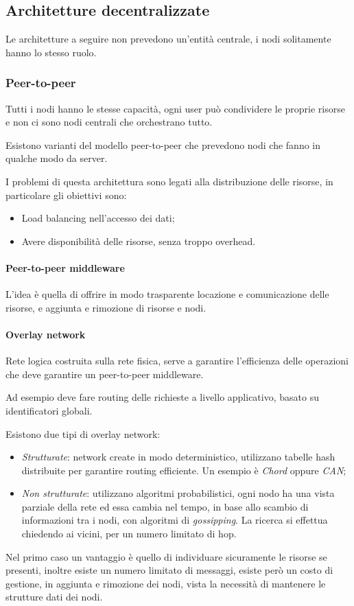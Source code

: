 \subsection{Architetture decentralizzate}
Le architetture a seguire non prevedono un'entità centrale, i nodi solitamente 
hanno lo stesso ruolo.

\subsubsection{Peer-to-peer}
Tutti i nodi hanno le stesse capacità, ogni user può condividere le proprie
risorse e non ci sono nodi centrali che orchestrano tutto.

Esistono varianti del modello peer-to-peer che prevedono nodi che fanno in 
qualche modo da server.

I problemi di questa architettura sono legati alla distribuzione delle risorse, 
in particolare gli obiettivi sono:
\begin{itemize}
    \item Load balancing nell'accesso dei dati;
    \item Avere disponibilità delle risorse, senza troppo overhead.
\end{itemize}

\paragraph{Peer-to-peer middleware}
L'idea è quella di offrire in modo trasparente locazione e comunicazione 
delle risorse, e aggiunta e rimozione di risorse e nodi.

\paragraph{Overlay network}
Rete logica costruita sulla rete fisica, serve a garantire l'efficienza
delle operazioni che deve garantire un peer-to-peer middleware.

Ad esempio deve fare routing delle richieste a livello applicativo, 
basato su identificatori globali.

Esistono due tipi di overlay network:
\begin{itemize}
    \item \emph{Strutturate}: network create in modo deterministico, utilizzano 
    tabelle hash distribuite per garantire routing efficiente. 
    Un esempio è \emph{Chord} oppure \emph{CAN};
    \item \emph{Non strutturate}: utilizzano algoritmi probabilistici, 
    ogni nodo ha una vista parziale della rete ed essa cambia nel tempo, 
    in base allo scambio di informazioni tra i nodi, con algoritmi di \emph{gossipping}.
    La ricerca si effettua chiedendo ai vicini, per un numero limitato di hop.
\end{itemize}
Nel primo caso un vantaggio è quello di individuare sicuramente le risorse se presenti,
inoltre esiste un numero limitato di messaggi, esiste però un costo di gestione, 
in aggiunta e rimozione dei nodi, vista la necessità di mantenere le strutture 
dati dei nodi.

